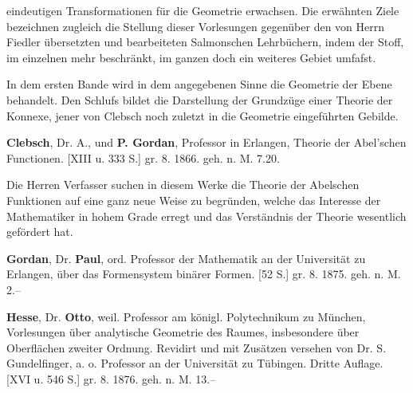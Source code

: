 \documentclass[11pt]{article}
\begin{document}
eindeutigen Transformationen f\"ur die Geometrie erwachsen. Die erw\"ahnten Ziele bezeichnen zugleich die Stellung dieser Vorlesungen gegen\"uber den von Herrn Fiedler \"ubersetzten und bearbeiteten Salmonschen Lehrb\"uchern, indem der Stoff, im einzelnen mehr beschr\"ankt, im ganzen doch ein weiteres Gebiet umfafst.

In dem ersten Bande wird in dem angegebenen Sinne die Geometrie der Ebene behandelt. Den Schlufs bildet die Darstellung der Grundz\"uge einer Theorie der Konnexe, jener von Clebsch noch zuletzt in die Geometrie eingef\"uhrten Gebilde.

\textbf{Clebsch}, Dr. A., und \textbf{P. Gordan}, Professor in Erlangen, Theorie der Abel'schen Functionen. [XIII u. 333 S.] gr. 8. 1866. geh. \hfill n. M. 7.20.

Die Herren Verfasser suchen in diesem Werke die Theorie der Abelschen Funktionen auf eine ganz neue Weise zu begr\"unden, welche das Interesse der Mathematiker in hohem Grade erregt und das Verst\"andnis der Theorie wesentlich gef\"ordert hat.

\textbf{Gordan}, Dr. \textbf{Paul}, ord. Professor der Mathematik an der Universit\"at zu Erlangen, \"uber das Formensystem bin\"arer Formen. [52 S.] gr. 8. 1875. geh. \hfill n. M. 2.--

\textbf{Hesse}, Dr. \textbf{Otto}, weil. Professor am k\"onigl. Polytechnikum zu M\"unchen, Vorlesungen \"uber analytische Geometrie des Raumes, insbesondere \"uber Oberfl\"achen zweiter Ordnung. Revidirt und mit Zus\"atzen versehen von Dr. S. Gundelfinger, a. o. Professor an der Universit\"at zu T\"ubingen. Dritte Auflage. [XVI u. 546 S.] gr. 8. 1876. geh. \hfill n. M. 13.--
\end{document}
